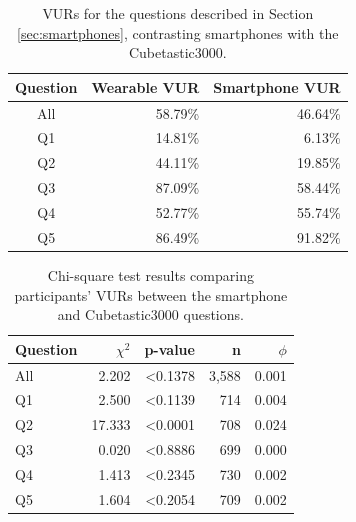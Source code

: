 \documentclass{acm_proc_article-sp}
\begin{document}
\begin{table}[t]
\begin{center}
\begin{tabular}{| c | r | r |}
\hline
 Question &  Wearable VUR & Smartphone VUR \\
 \hline
 All & 58.79\% & 46.64\%\\
Q1 & 14.81\%  &  6.13\%\\
Q2 & 44.11\%  &  19.85\%\\
Q3 & 87.09\%  &  58.44\%\\
Q4 & 52.77\%  & 55.74\%\\
Q5 & 86.49\%  &  91.82\%\\ 
\hline
\end{tabular}
\caption{VURs for the questions described in Section \ref{sec:smartphones}, contrasting smartphones with the Cubetastic3000.}
\label{deviceVUR}
\end{center}
\end{table}

\begin{table}%
\begin{center}
\begin{tabular}{|l|r|r|r|r|}
\hline
Question & $\chi^2$ & p-value & n & $\phi$ \\
\hline
All & 2.202 & <0.1378 & 3,588 & 0.001\\
Q1 & 2.500 & <0.1139 & 714 & 0.004\\
Q2 & 17.333 & <0.0001 & 708 &  0.024\\
Q3 & 0.020 & <0.8886 & 699 &  0.000\\
Q4 & 1.413 & <0.2345 & 730& 0.002\\
Q5 & 1.604 & <0.2054 & 709 & 0.002\\
\hline
\end{tabular}
\caption{Chi-square test results comparing participants' VURs between the smartphone and Cubetastic3000 questions.}
\label{betweendevice}
\end{center}
\end{table}
						
\end{document}
